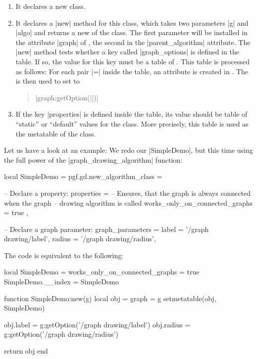 \begin{enumerate}
\item It declares a new class.
\item It declares a |new| method for this class, which takes two
  parameters |g| and |algo| and returns a new  of the
  class. The first parameter will be installed in the attribute
  |graph| of , the second in the |parent_algorithm|
  attribute. The |new| method tests whether a key called 
  |graph_options| is defined in the  table. If so, the
  value for this key must be a table of . This table is
  processed as follows: For each pair  |=| 
  inside the  table, an attribute  is created
  in . The  is then used to set 
  to 
  \begin{quote}
    |graph:getOption(||)|
  \end{quote}
\item If the key |properties| is defined inside the  table,
  its value should be table of ``static'' or ``default'' values for
  the class. More precisely, this table is used as the metatable of
  the class.
\end{enumerate}

Let us have a look at an example: We redo our |SimpleDemo|, but this
time using the full power of the |graph_drawing_algorithm| function:

\begin{codeexample}
local SimpleDemo = pgf.gd.new_algorithm_class = {
  
  -- Declare a property:
  properties = {
    -- Ensures, that the graph is always connected when the graph
    -- drawing algorithm is called
    works_only_on_connected_graphs = true
  },

  -- Declare a graph parameter:
  graph_parameters = {
    label  = '/graph drawing/label',
    radius = '/graph drawing/radius',
  }
}
\end{codeexample}

The code is equivalent to the following:
\begin{codeexample}
local SimpleDemo = { works_only_on_connected_graphs = true }
SimpleDemo.__index = SimpleDemo

function SimpleDemo:new(g)
  local obj = { graph = g }
  setmetatable(obj, SimpleDemo)
  
  obj.label  = g:getOption('/graph drawing/label')
  obj.radius = g:getOption('/graph drawing/radius')
  
  return obj  
end  
\end{codeexample}

